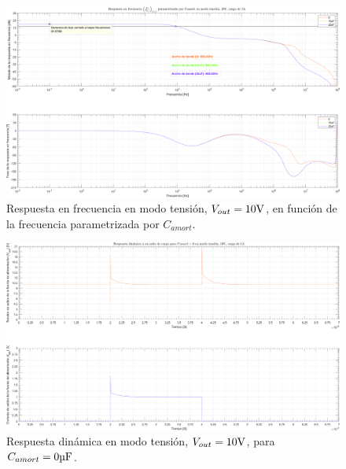 \clearpage

\begin{figure}[H] %
\begin{center}
\includegraphics[width=1.1 \textwidth, angle=90]{./img/plots/rf/power_supply_CAMORT_RF_Modo1.png}
\caption{\label{fig:fig_power_supply_CAMORT_RF_Modo1}\footnotesize{Respuesta en frecuencia en modo tensión, $V_{out} = 10 \si[per-mode=symbol]{\volt}$, en función de la frecuencia parametrizada por $C_{amort}$.}}
\end{center}
\end{figure}

\clearpage

\begin{figure}[H] %
\begin{center}
\includegraphics[width=1.1 \textwidth, angle=90]{./img/plots/dynamic/power_supply_CAMORT_0_STEP_Modo1.png}
\caption{\label{fig:fig_power_supply_CAMORT_STEP_0_Modo1}\footnotesize{Respuesta dinámica en modo tensión, $V_{out} = 10 \si[per-mode=symbol]{\volt}$, para $C_{amort} = 0 \si[per-mode=symbol]{\micro\farad} $.}}
\end{center}
\end{figure}

